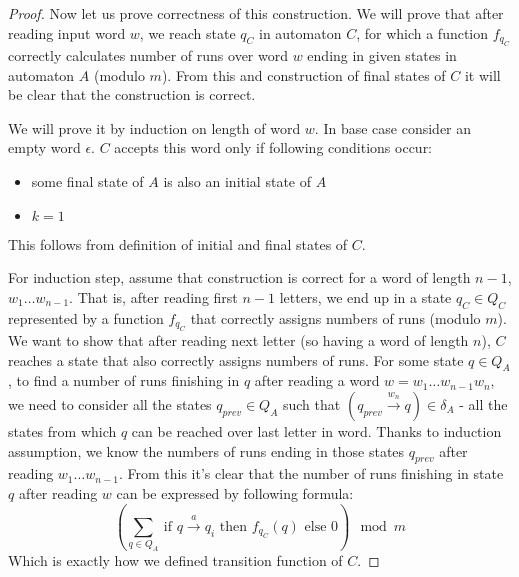\documentclass[12pt]{article}
\theoremstyle{definition}
\begin{document}
\begin{proof}
    Now let us prove correctness of this construction. We will prove that after reading input word $w$, we reach state $q_C$ in automaton $C$, for which a function $f_{q_C}$ correctly calculates number of runs over word $w$ ending in given states in automaton $A$ (modulo $m$). From this and construction of final states of $C$ it will be clear that the construction is correct.

    We will prove it by induction on length of word $w$.
    In base case consider an empty word $\epsilon$. $C$ accepts this word only if following conditions occur:
    \begin{itemize}
        \item some final state of $A$ is also an initial state of $A$
        \item $k = 1$
    \end{itemize}
    This follows from definition of initial and final states of $C$.
    
    For induction step, assume that construction is correct for a word of length $n-1$, $w_1 \ldots w_{n-1}$. That is, after reading first $n-1$ letters, we end up in a state $q_C \in Q_C$ represented by a function $f_{q_C}$ that correctly assigns numbers of runs (modulo $m$). We want to show that after reading next letter (so having a word of length $n$), $C$ reaches a state that also correctly assigns numbers of runs. For some state $q \in Q_A$, to find a number of runs finishing in $q$ after reading a word $w = w_1\ldots w_{n-1}w_n$, we need to consider all the states $q_{prev} \in Q_A$ such that $(q_{prev} \xrightarrow{w_n} q) \in \delta_A$ - all the states from which $q$ can be reached over last letter in word. Thanks to induction assumption, we know the numbers of runs ending in those states $q_{prev}$ after reading $w_1 \ldots w_{n-1}$. From this it's clear that the number of runs finishing in state $q$ after reading $w$ can be expressed by following formula:
    $$(\sum_{q \in Q_A} \ \text{if } q \xrightarrow{a} q_i \text{ then } f_{q_C}(q) \text{ else } 0) \mod m$$
    Which is exactly how we defined transition function of $C$.



\end{proof}
\end{document}
